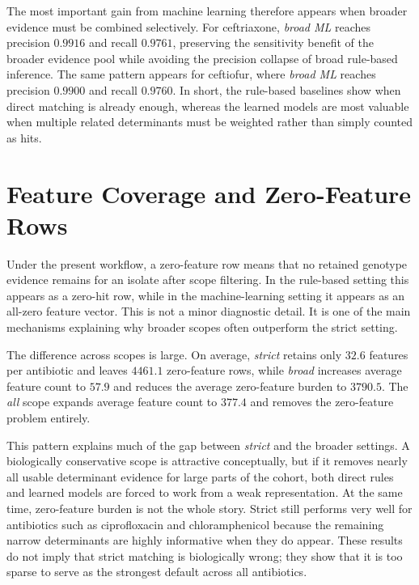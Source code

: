 The most important gain from machine learning therefore appears when broader evidence must be combined selectively. For ceftriaxone, \textit{broad ML} reaches precision \(0.9916\) and recall \(0.9761\), preserving the sensitivity benefit of the broader evidence pool while avoiding the precision collapse of broad rule-based inference. The same pattern appears for ceftiofur, where \textit{broad ML} reaches precision \(0.9900\) and recall \(0.9760\). In short, the rule-based baselines show when direct matching is already enough, whereas the learned models are most valuable when multiple related determinants must be weighted rather than simply counted as hits.

\section{Feature Coverage and Zero-Feature Rows}

Under the present workflow, a zero-feature row means that no retained genotype evidence remains for an isolate after scope filtering. In the rule-based setting this appears as a zero-hit row, while in the machine-learning setting it appears as an all-zero feature vector. This is not a minor diagnostic detail. It is one of the main mechanisms explaining why broader scopes often outperform the strict setting.

The difference across scopes is large. On average, \textit{strict} retains only \(32.6\) features per antibiotic and leaves \(4461.1\) zero-feature rows, while \textit{broad} increases average feature count to \(57.9\) and reduces the average zero-feature burden to \(3790.5\). The \textit{all} scope expands average feature count to \(377.4\) and removes the zero-feature problem entirely.

This pattern explains much of the gap between \textit{strict} and the broader settings. A biologically conservative scope is attractive conceptually, but if it removes nearly all usable determinant evidence for large parts of the cohort, both direct rules and learned models are forced to work from a weak representation. At the same time, zero-feature burden is not the whole story. Strict still performs very well for antibiotics such as ciprofloxacin and chloramphenicol because the remaining narrow determinants are highly informative when they do appear. These results do not imply that strict matching is biologically wrong; they show that it is too sparse to serve as the strongest default across all antibiotics.

